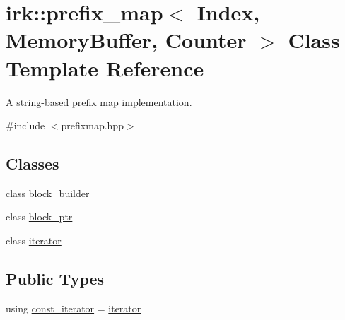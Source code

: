 \hypertarget{classirk_1_1prefix__map}{}\section{irk\+:\+:prefix\+\_\+map$<$ Index, Memory\+Buffer, Counter $>$ Class Template Reference}
\label{classirk_1_1prefix__map}


A string-\/based prefix map implementation.  




{\ttfamily \#include $<$prefixmap.\+hpp$>$}

\subsection*{Classes}
\begin{DoxyCompactItemize}
\item 
class \mbox{\hyperlink{classirk_1_1prefix__map_1_1block__builder}{block\+\_\+builder}}
\item 
class \mbox{\hyperlink{classirk_1_1prefix__map_1_1block__ptr}{block\+\_\+ptr}}
\item 
class \mbox{\hyperlink{classirk_1_1prefix__map_1_1iterator}{iterator}}
\end{DoxyCompactItemize}
\subsection*{Public Types}
\begin{DoxyCompactItemize}
\item 
using \mbox{\hyperlink{classirk_1_1prefix__map_abe4f68e5fc9c0d72e34b87f108e653ed}{const\+\_\+iterator}} = \mbox{\hyperlink{classirk_1_1prefix__map_1_1iterator}{iterator}}
\end{DoxyCompactItemize}
